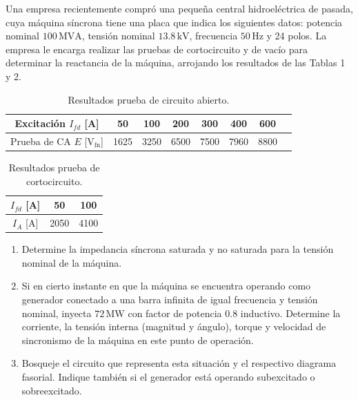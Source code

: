 \documentclass[
  11pt,
  letterpaper,
   addpoints,
   answers
  ]{exam}
\begin{document}
\begin{questions}
\begin{solution}
\end{solution}
\question Una empresa recientemente compró una pequeña central hidroeléctrica de pasada, cuya máquina síncrona tiene una placa que indica los siguientes datos: potencia nominal $100 \, \text{MVA}$, tensión nominal $13.8 \, \text{kV}$, frecuencia $50 \, \text{Hz}$ y 24 polos. La empresa le encarga realizar las pruebas de cortocircuito y de vacío para determinar la reactancia de la máquina, arrojando los resultados de las Tablas 1 y 2.

\begin{table}[H]
    \centering
    \caption{Resultados prueba de circuito abierto.}
    \begin{tabular}{|c|c|c|c|c|c|c|c|}
        \hline
        Excitación $I_{fd}$ [A] & 50 & 100 & 200 & 300 & 400 & 600 \\
        \hline
        Prueba de CA $E$ [V$_{\text{fn}}$] & 1625 & 3250 & 6500 & 7500 & 7960 & 8800 \\
        \hline
    \end{tabular}
\end{table}

\begin{table}[H]
    \centering
    \caption{Resultados prueba de cortocircuito.}
    \begin{tabular}{|c|c|c|}
        \hline
        $I_{fd}$ [A] & 50 & 100 \\
        \hline
        $I_A$ [A] & 2050 & 4100 \\
        \hline
    \end{tabular}
\end{table}

\begin{enumerate}
    \item Determine la impedancia síncrona saturada y no saturada para la tensión nominal de la máquina.
    \item Si en cierto instante en que la máquina se encuentra operando como generador conectado a una barra infinita de igual frecuencia y tensión nominal, inyecta $72 \, \text{MW}$ con factor de potencia 0.8 inductivo. Determine la corriente, la tensión interna (magnitud y ángulo), torque y velocidad de sincronismo de la máquina en este punto de operación.
    \item Bosqueje el circuito que representa esta situación y el respectivo diagrama fasorial. Indique también si el generador está operando subexcitado o sobreexcitado.
\end{enumerate}


\end{questions}
\end{document}
